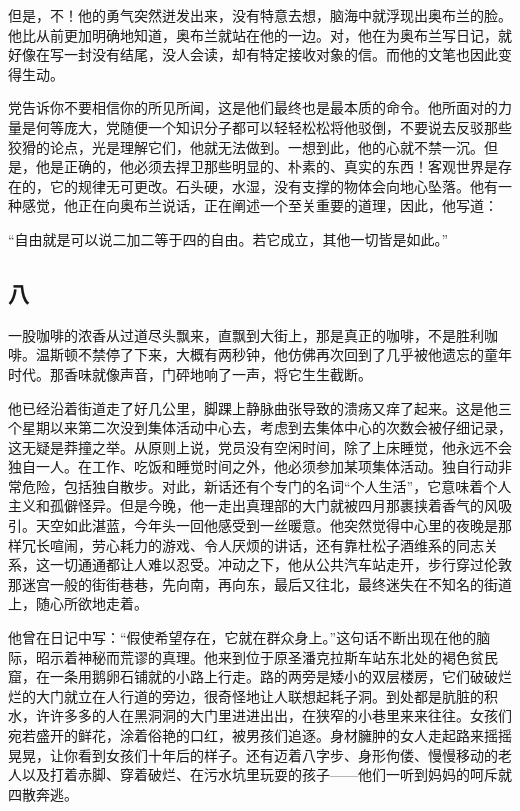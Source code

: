 但是，不！他的勇气突然迸发出来，没有特意去想，脑海中就浮现出奥布兰的脸。他比从前更加明确地知道，奥布兰就站在他的一边。对，他在为奥布兰写日记，就好像在写一封没有结尾，没人会读，却有特定接收对象的信。而他的文笔也因此变得生动。

党告诉你不要相信你的所见所闻，这是他们最终也是最本质的命令。他所面对的力量是何等庞大，党随便一个知识分子都可以轻轻松松将他驳倒，不要说去反驳那些狡猾的论点，光是理解它们，他就无法做到。一想到此，他的心就不禁一沉。但是，他是正确的，他必须去捍卫那些明显的、朴素的、真实的东西！客观世界是存在的，它的规律无可更改。石头硬，水湿，没有支撑的物体会向地心坠落。他有一种感觉，他正在向奥布兰说话，正在阐述一个至关重要的道理，因此，他写道：

``自由就是可以说二加二等于四的自由。若它成立，其他一切皆是如此。''

\subsection{八}\label{ux516b}

一股咖啡的浓香从过道尽头飘来，直飘到大街上，那是真正的咖啡，不是胜利咖啡。温斯顿不禁停了下来，大概有两秒钟，他仿佛再次回到了几乎被他遗忘的童年时代。那香味就像声音，门砰地响了一声，将它生生截断。

他已经沿着街道走了好几公里，脚踝上静脉曲张导致的溃疡又痒了起来。这是他三个星期以来第二次没到集体活动中心去，考虑到去集体中心的次数会被仔细记录，这无疑是莽撞之举。从原则上说，党员没有空闲时间，除了上床睡觉，他永远不会独自一人。在工作、吃饭和睡觉时间之外，他必须参加某项集体活动。独自行动非常危险，包括独自散步。对此，新话还有个专门的名词``个人生活''，它意味着个人主义和孤僻怪异。但是今晚，他一走出真理部的大门就被四月那裹挟着香气的风吸引。天空如此湛蓝，今年头一回他感受到一丝暖意。他突然觉得中心里的夜晚是那样冗长喧闹，劳心耗力的游戏、令人厌烦的讲话，还有靠杜松子酒维系的同志关系，这一切通通都让人难以忍受。冲动之下，他从公共汽车站走开，步行穿过伦敦那迷宫一般的街街巷巷，先向南，再向东，最后又往北，最终迷失在不知名的街道上，随心所欲地走着。

他曾在日记中写：``假使希望存在，它就在群众身上。''这句话不断出现在他的脑际，昭示着神秘而荒谬的真理。他来到位于原圣潘克拉斯车站东北处的褐色贫民窟，在一条用鹅卵石铺就的小路上行走。路的两旁是矮小的双层楼房，它们破破烂烂的大门就立在人行道的旁边，很奇怪地让人联想起耗子洞。到处都是肮脏的积水，许许多多的人在黑洞洞的大门里进进出出，在狭窄的小巷里来来往往。女孩们宛若盛开的鲜花，涂着俗艳的口红，被男孩们追逐。身材臃肿的女人走起路来摇摇晃晃，让你看到女孩们十年后的样子。还有迈着八字步、身形佝偻、慢慢移动的老人以及打着赤脚、穿着破烂、在污水坑里玩耍的孩子------他们一听到妈妈的呵斥就四散奔逃。

